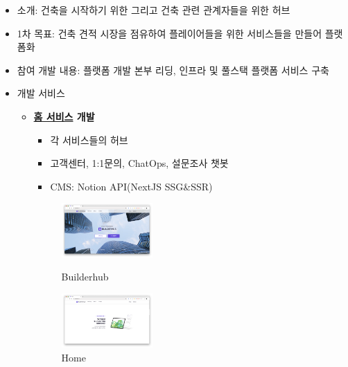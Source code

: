 
\label{bhplf}

\begin{itemize}[label=]
	\item 소개: 건축을 시작하기 위한 그리고 건축 관련 관계자들을 위한 허브
	\item 1차 목표: 건축 견적 시장을 점유하여 플레이어들을 위한 서비스들을 만들어 플랫폼화
	\item 참여 개발 내용: 플랫폼 개발 본부 리딩, 인프라 및 풀스택 플랫폼 서비스 구축
	\item 개발 서비스
	      \begin{itemize}[label=]
		      \item \textbf{\href{https://builderhub.io}{홈 서비스} 개발}
		            \begin{itemize}
			            \item 각 서비스들의 허브
			            \item 고객센터, 1:1문의, ChatOps, 설문조사 챗봇
			            \item CMS: Notion API(NextJS SSG\&SSR)
		            \end{itemize}
		            \begin{figure}[!ht]
			            \begin{fullwidth}
				            \parbox{0.35\textwidth}{
					            \centering
					            \includegraphics[width=0.35\textwidth]{images/builderhub-home-1.png}
					            \caption*{Builderhub}
				            }\qquad
				            \parbox{0.35\textwidth}{
					            \centering
					            \includegraphics[width=0.35\textwidth]{images/builderhub-home-2.png}
					            \caption*{Home}
				            }\qquad

\end{fullwidth}
\end{figure}
\end{itemize}
\end{itemize}
